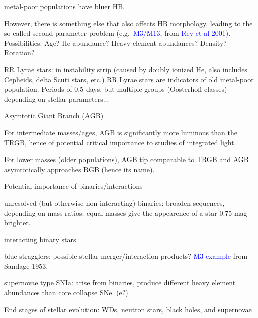 \documentclass[12pt]{article}
\begin{document}
\begin{itemize*}
\begin{itemize*}
                metal-poor populations have bluer HB.
            \item However, there is something else that also affects HB
                morphology, leading to the so-called second-parameter problem
                (e.g.\ \textcolor{blue}{M3/M13}, from \textcolor{blue}{Rey et al
                2001}). Possibilities: Age? He abundance? Heavy element
                abundances? Density? Rotation?
            \item RR Lyrae stars: in instability strip (caused by doubly
                ionized He, also includes Cepheids, delta Scuti stars, etc.)
                RR Lyrae stars are indicators of old metal-poor population.
                Periods of 0.5 days, but multiple groups (Oosterhoff classes)
                depending on stellar parameters$\ldots$
        \end{itemize*}
    \item Asymtotic Giant Branch (AGB)
        \begin{itemize*}
            \item For intermediate masses/ages, AGB is significantly more
                luminous than the TRGB, hence of potential critical importance
                to studies of integrated light.
            \item For lower masses (older populations), AGB tip comparable
                to TRGB and AGB asymtotically approaches RGB (hence its name).
        \end{itemize*}
    \item Potential importance of binaries/interactions
        \begin{itemize*}
            \item unresolved (but otherwise non-interacting) binaries:
                broaden sequences, depending on mass ratios: equal masses
                give the appearence of a star 0.75 mag brighter.
            \item interacting binary stars
            \item blue stragglers: possible stellar merger/interaction products?
                \textcolor{blue}{M3 example} from Sandage 1953.
            \item supernovae type SNIa: arise from binaries, produce different
                heavy element abundances than core collapse SNe. (e?)
        \end{itemize*}
    \item End stages of stellar evolution:
        WDs, neutron stars, black holes, and supernovae

\end{itemize*}
\end{document}
